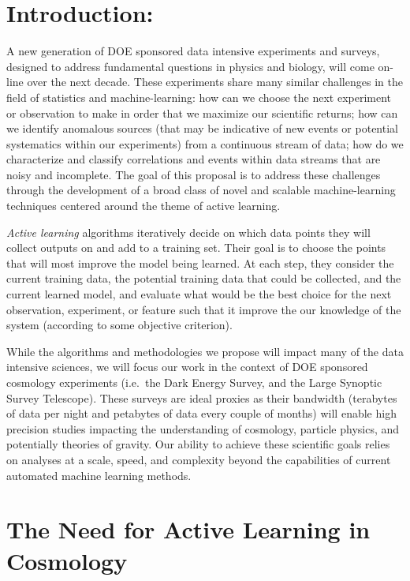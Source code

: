 \documentclass[useAMS,usenatbib,tightenlines,11pt,preprint]{aastex}
\begin{document}
\section{Introduction:}
A new generation of DOE sponsored data intensive experiments and
surveys, designed to address fundamental questions in physics and
biology, will come on-line over the next decade. These experiments
share many similar challenges in the field of statistics and
machine-learning: how can we choose the next experiment or observation
to make in order that we maximize our scientific returns; how can we
identify anomalous sources (that may be indicative of new events or
potential systematics within our experiments) from a continuous stream
of data; how do we characterize and classify correlations and events
within data streams that are noisy and incomplete. The goal of this
proposal is to address these challenges through the development of a broad
class of novel and scalable machine-learning techniques centered
around the theme of active learning.

{\it Active learning} algorithms iteratively decide on which data
points they will collect outputs on and add to a training set.  Their
goal is to choose the points that will most improve the model being
learned.  At each step, they consider the current training data, the
potential training data that could be collected, and the current
learned model, and evaluate what would be the best choice for the next
observation, experiment, or feature such that it improve the our
knowledge of the system (according to some objective criterion).


While the algorithms and methodologies we propose will impact many of
the data intensive sciences, we will focus our work in the context of
DOE sponsored cosmology experiments (i.e.\ the Dark Energy Survey, and
the Large Synoptic Survey Telescope). These surveys are ideal proxies
as their bandwidth (terabytes of data per night and petabytes of data
every couple of months) will enable high precision studies impacting
the understanding of cosmology, particle physics, and potentially
theories of gravity.  Our ability to achieve these scientific goals
relies on analyses at a scale, speed, and complexity beyond the
capabilities of current automated machine learning methods.


\section{The Need for Active Learning in Cosmology}
\end{document}
